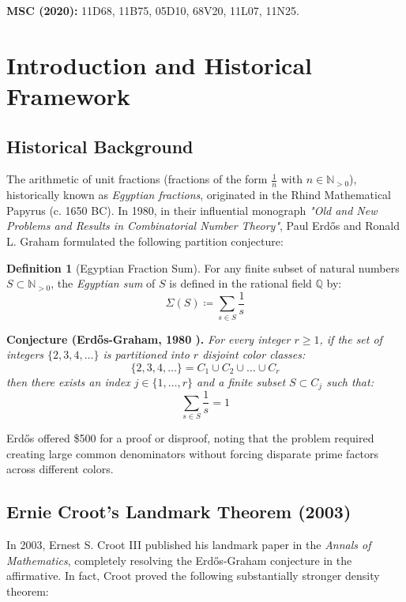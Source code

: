 \documentclass[11pt,a4paper]{article}
\theoremstyle{definition}
\newtheorem{definition}[theorem]{Definition}
\begin{document}
\noindent\textbf{MSC (2020):} 11D68, 11B75, 05D10, 68V20, 11L07, 11N25.

\tableofcontents
\newpage

\section{Introduction and Historical Framework}

\subsection{Historical Background}
The arithmetic of unit fractions (fractions of the form $\frac{1}{n}$ with $n \in \mathbb{N}_{>0}$), historically known as \emph{Egyptian fractions}, originated in the Rhind Mathematical Papyrus (c. 1650 BC).
In 1980, in their influential monograph \emph{"Old and New Problems and Results in Combinatorial Number Theory"}, Paul Erd\H{o}s and Ronald L. Graham \cite{erdos1980old} formulated the following partition conjecture:

\begin{definition}[Egyptian Fraction Sum]\label{def:egyptian_sum}
For any finite subset of natural numbers $S \subset \mathbb{N}_{>0}$, the \emph{Egyptian sum} of $S$ is defined in the rational field $\mathbb{Q}$ by:
\begin{equation}\label{eq:egyptian_sum}
\Sigma(S) \coloneqq \sum_{s \in S} \frac{1}{s}
\end{equation}
\end{definition}

\noindent\textbf{Conjecture (Erd\H{o}s-Graham, 1980 \cite{erdos1980old}).} \textit{For every integer $r \ge 1$, if the set of integers $\{2, 3, 4, \dots\}$ is partitioned into $r$ disjoint color classes:}
\[ \{2, 3, 4, \dots\} = C_1 \cup C_2 \cup \dots \cup C_r \]
\textit{then there exists an index $j \in \{1, \dots, r\}$ and a finite subset $S \subset C_j$ such that:}
\begin{equation}\label{eq:eg_target}
\sum_{s \in S} \frac{1}{s} = 1
\end{equation}

Erd\H{o}s offered \$500 for a proof or disproof, noting that the problem required creating large common denominators without forcing disparate prime factors across different colors.

\subsection{Ernie Croot's Landmark Theorem (2003)}
In 2003, Ernest S. Croot III \cite{croot2003} published his landmark paper in the \emph{Annals of Mathematics}, completely resolving the Erd\H{o}s-Graham conjecture in the affirmative. In fact, Croot proved the following substantially stronger density theorem:
\end{document}
